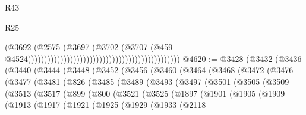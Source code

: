 \begin{lexlean}{R43}
\begin{lexlean}{R25}
\begin{coremodule}
{{{{{{{{{{{{{{{{{{{{{{{{{{{{{{{{{{{{{{{{{{{{{{{{{{{{{{{{{{{{{{{{{{{{{{{{{{{{{{{{{{{{{{{{{{{{{{{{{{{{{{{{{{{{{{{{{{{{{{{{{{{{{{{{{{{{{{{{{{{{{{{{{{{{{{{{{{{{{{{{{{{{{{{{{{{{{{{{{{{{{{{{{{{{{{{{{                                                                                      (@3692
                                                                                        (@2575
                                                                                          (@3697
                                                                                            (@3702
                                                                                              (@3707
                                                                                                (@459
                                                                                                  @4524)))))))))))))))))))))))))))))))))))))))))))))))
@4620 := @3428
    (@3432
      (@3436
        (@3440
          (@3444
            (@3448
              (@3452
                (@3456
                  (@3460
                    (@3464
                      (@3468
                        (@3472
                          (@3476
                            (@3477
                              (@3481
                                (@826
                                  (@3485
                                    (@3489
                                      (@3493
                                        (@3497
                                          (@3501
                                            (@3505
                                              (@3509
                                                (@3513
                                                  (@3517
                                                    (@899
                                                      (@800
                                                        (@3521
                                                          (@3525
                                                            (@1897
                                                              (@1901
                                                                (@1905
                                                                  (@1909
                                                                    (@1913
                                                                      (@1917
                                                                        (@1921
                                                                          (@1925
                                                                            (@1929
                                                                              (@1933
                                                                                (@2118
}}}}}}}}}}}}}}}}}}}}}}}}}}}}}}}}}}}}}}}}}}}}}}}}}}}}}}}}}}}}}}}}}}}}}}}}}}}}}}}}}}}}}}}}}}}}}}}}}}}}}}}}}}}}}}}}}}}}}}}}}}}}}}}}}}}}}}}}}}}}}}}}}}}}}}}}}}}}}}}}}}}}}}}}}}}}}}}}}}}}}}}}}}}}}}}}}
\end{coremodule}
\end{lexlean}
\end{lexlean}
